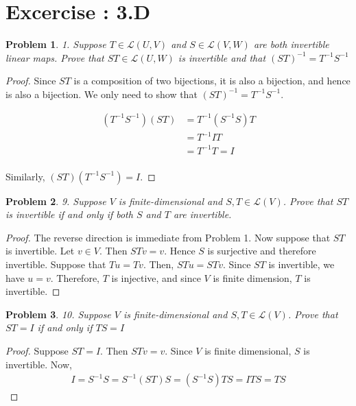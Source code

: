 \documentclass[12pt]{book}
\newtheorem*{problem*}{Problem}
\newcommand{\LL}{\mathcal{L}}
\begin{document}
\section{Excercise : 3.D}

\begin{problem*}
  1. Suppose $T \in \LL(U,V)$ and $ S \in \LL(V,W)$ are both invertible
  linear maps. Prove that $ST \in \LL(U,W)$ is invertible and that $(ST)^{-1} = T^{-1}S^{-1}$
\end{problem*}

\begin{proof}
  Since $ST$ is a composition of two bijections, it is also a bijection, and hence is also a bijection. We only need to show that $(ST)^{-1} = T^{-1}S^{-1}$.

  \begin{align*}
    (T^{-1} S^{-1}) (S T) & = T^{-1} (S^{-1} S) T\\
    & = T^{-1} I T\\
    & = T^{-1}T = I \\
  \end{align*}

  Similarly, $(S T) (T^{-1} S^{-1}) = I$.
\end{proof}

\begin{problem*}9. Suppose $V$ is finite-dimensional and $S,T \in \LL(V)$. Prove that $ST$ is invertible if and only if both $S$ and $T$ are invertible.\end{problem*}

\begin{proof}
  The reverse direction is immediate from Problem 1. Now suppose that $ST$ is invertible. Let $v \in V$. Then $STv = v$. Hence $S$ is surjective and therefore invertible. Suppose that $Tu = Tv$. Then, $ST u = ST v$. Since $ST$ is invertible, we have $u = v$. Therefore, $T$ is injective, and since $V$ is finite dimension, $T$ is invertible. 
\end{proof}

\begin{problem*}10. Suppose $V$ is finite-dimensional and $S, T \in \LL(V)$. Prove that $ST = I$ if and only if $TS = I$\end{problem*}

\begin{proof}
  Suppose $ST = I$. Then $STv = v$. Since $V$ is finite dimensional, $S$ is invertible. Now,
  \begin{align*}
    I = S^{-1}S = S^{-1}(ST)S = (S^{-1}S)TS = ITS = TS
  \end{align*}
\end{proof}
\end{document}
